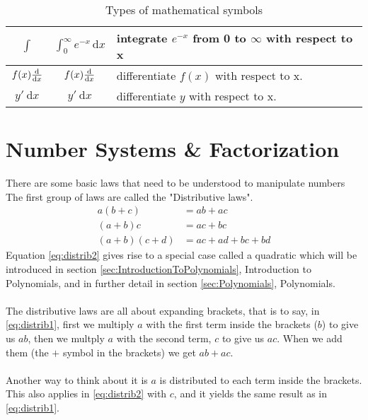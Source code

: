 \begin{table}[!htb]
\begin{tabularx}{\linewidth}{| c || c | X |}
  $ \int    $ & $ \int_0^\infty e^{-x}\,\mathrm{d}x $
                                & integrate $ e^{-x} $ from 0 to $ \infty $
                                with respect to x                     \\ \hline
  $ f(x)\frac{\mathrm{d}}{\mathrm{d}x} $ & $ f(x)\frac{\mathrm{d}}{\mathrm{d}x} $ & differentiate $f(x)$ with respect
                                            to x.                      \\ \hline
  $ y'~\mathrm{d}x $ & $ y'~\mathrm{d}x   $ & differentiate $y$ with respect to
                                            x.                         \\ \hline
\end{tabularx}
\caption{Types of mathematical symbols}
\end{table}
\newpage
\section{Number Systems \& Factorization}
\label{sec:NumberSystemsAndFactorization}
There are some basic laws that need to be understood to manipulate numbers
The first group of laws are called the "Distributive laws".
\begin{align}
      a(b+c) & = ab + ac \label{eq:distrib0} \\
      (a+b)c & = ac + bc \label{eq:distrib1} \\
  (a+b)(c+d) & = ac + ad + bc + bd \label{eq:distrib2}
\end{align}
Equation \ref{eq:distrib2} gives rise to a special case called a quadratic
which will be introduced in section \ref{sec:IntroductionToPolynomials},
Introduction to Polynomials, and in further detail in section
\ref{sec:Polynomials}, Polynomials.\\
\\
The distributive laws are all about expanding brackets, that is to say, in
\ref{eq:distrib1}, first we multiply $a$ with the first term inside the
brackets ($b$) to give us $ab$, then we multply $a$ with the second term, $c$
to give us $ac$. When we add them (the $+$ symbol in the brackets) we get
$ab + ac$.\\
\\
Another way to think about it is $a$ is distributed to each term inside the
brackets. This also applies in \ref{eq:distrib2} with $c$, and it yields the 
same result as in \ref{eq:distrib1}.

